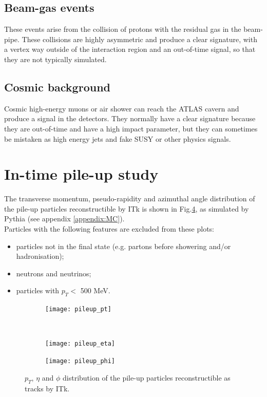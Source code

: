 \documentclass[a4paper,twoside,12pt]{book}
\begin{document}
\subsection*{Beam-gas events}
These events arise from the collision of protons with the residual gas in the beam-pipe. These
collisions are highly asymmetric and produce a clear signature, with a vertex way outside of
the interaction region and an out-of-time signal, so that they are not typically simulated\cite{ATLAS_pileup}.

\subsection*{Cosmic background}
Cosmic high-energy muons or air shower can reach the ATLAS cavern and produce a signal in the detectors.
They normally have a clear signature because they are out-of-time and have a high impact
parameter, but they can sometimes
be mistaken as high energy jets and fake SUSY or other physics signals\cite{ATLAS_cosmic}. \\

\section{In-time pile-up study}

The transverse momentum, pseudo-rapidity and azimuthal angle distribution of the pile-up particles reconstructible by ITk is shown in Fig.\ref{fig:pileupDists}, as simulated by 
Pythia (see appendix \ref{appendix:MC}).\\

Particles with the following
features are excluded from these plots:

\begin{itemize}
\item particles not in the final state (e.g. partons before showering and/or hadronisation);
\item neutrons and neutrinos;
\item particles with $p_{T} <$ 500 MeV.
\end{itemize}

\begin{figure}
\begin{subfigure}{\linewidth}
\centering
\texttt{[image: pileup\_pt]}
\caption{}
\label{fig:pileup_pt}
\end{subfigure}\\[1ex]
\begin{subfigure}{\linewidth}
\centering
\texttt{[image: pileup\_eta]}
\caption{}
\label{fig:pileup_eta}
\end{subfigure}
\begin{subfigure}{\linewidth}
\centering
\texttt{[image: pileup\_phi]}
\caption{}
\label{fig:pileup_phi}
\end{subfigure}
\caption{$p_{T}$, $\eta$ and $\phi$ distribution of the pile-up particles reconstructible as tracks by ITk.}
\label{fig:pileupDists}
\end{figure}
\end{document}
